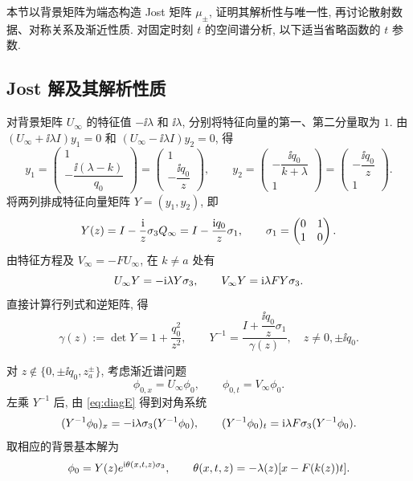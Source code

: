 
本节以背景矩阵为端态构造 Jost 矩阵 $\mu_\pm$, 证明其解析性与唯一性,
再讨论散射数据、对称关系及渐近性质. 对固定时刻 $t$ 的空间谱分析, 以下适当省略函数的 $t$ 参数.

\subsection{Jost 解及其解析性质}
对背景矩阵 $U_\infty$ 的特征值 $-\ii\lambda$ 和 $\ii\lambda$,
分别将特征向量的第一、第二分量取为 $1$.
由 $(U_\infty+\ii\lambda I)y_1=0$ 和 $(U_\infty-\ii\lambda I)y_2=0$, 得
\begin{equation*}
y_1=\begin{pmatrix}1\\[2pt]-\dfrac{\ii(\lambda-k)}{q_0}\end{pmatrix}
=\begin{pmatrix}1\\[2pt]-\dfrac{\ii q_0}{z}\end{pmatrix},\qquad
y_2=\begin{pmatrix}-\dfrac{\ii q_0}{k+\lambda}\\[2pt]1\end{pmatrix}
=\begin{pmatrix}-\dfrac{\ii q_0}{z}\\[2pt]1\end{pmatrix}.
\end{equation*}
将两列排成特征向量矩阵 $Y=(y_1,y_2)$, 即
\begin{equation}\label{eq:E}
Y(z)=I-\dfrac{\mathrm{i}}{z}\sigma_3 Q_\infty
=I-\dfrac{\mathrm{i} q_0}{z}\sigma_1,\qquad
\sigma_1=\begin{pmatrix}0&1\\1&0\end{pmatrix}.
\end{equation}
由特征方程及 $V_\infty=-FU_\infty$, 在 $k\ne a$ 处有
\begin{equation}\label{eq:diagE}
U_\infty Y=-\mathrm{i}\lambda Y\sigma_3,\qquad
V_\infty Y=\mathrm{i}\lambda F Y\sigma_3.
\end{equation}
直接计算行列式和逆矩阵, 得
\begin{equation}\label{eq:Y-inverse}
\gamma(z):=\det Y=1+\dfrac{q_0^2}{z^2},\qquad
Y^{-1}=\dfrac{I+\dfrac{\ii q_0}{z}\sigma_1}{\gamma(z)},\quad z\ne0,\pm\ii q_0.
\end{equation}

对 $z\notin\{0,\pm\ii q_0,z_a^\pm\}$, 考虑渐近谱问题
\begin{equation}\label{eq:background-lax}
\phi_{0,x}=U_\infty\phi_0,\qquad \phi_{0,t}=V_\infty\phi_0.
\end{equation}
左乘 $Y^{-1}$ 后, 由 \eqref{eq:diagE} 得到对角系统
\begin{equation*}
(Y^{-1}\phi_0)_x=-\mathrm{i}\lambda\sigma_3(Y^{-1}\phi_0),\qquad
(Y^{-1}\phi_0)_t=\mathrm{i}\lambda F\sigma_3(Y^{-1}\phi_0).
\end{equation*}
取相应的背景基本解为
\begin{equation}\label{eq:theta}
\phi_0=Y(z)e^{\mathrm{i}\theta(x,t,z)\sigma_3},\qquad
\theta(x,t,z)=-\lambda(z)[x-F(k(z))t].
\end{equation}

